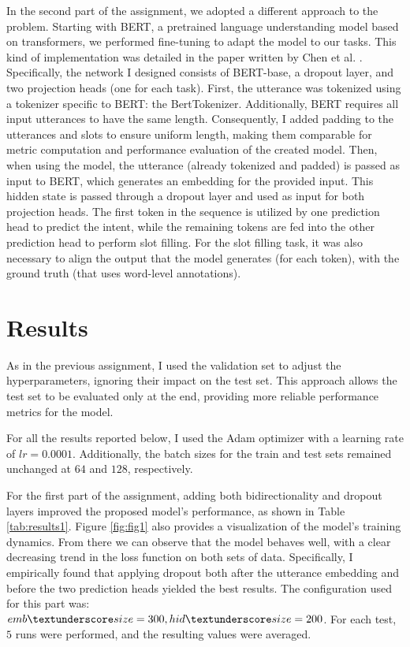 \documentclass[a4paper]{article}
\begin{document}
In the second part of the assignment, we adopted a different approach to the problem. Starting with BERT, a pretrained language understanding model based on transformers, we performed fine-tuning to adapt the model to our tasks.
This kind of implementation was detailed in the paper written by Chen et al. \cite{BERT}. Specifically, the network I designed consists of BERT-base, a dropout layer, and two projection heads (one for each task).
First, the utterance was tokenized using a tokenizer specific to BERT: the BertTokenizer.
Additionally, BERT requires all input utterances to have the same length. Consequently, I added padding to the utterances and slots to ensure uniform length, making them comparable for metric computation and performance evaluation of the created model.
Then, when using the model, the utterance (already tokenized and padded) is passed as input to BERT, which generates an embedding for the provided input. This hidden state is passed through a dropout layer and used as input for both projection heads. The first token in the sequence is utilized by one prediction head to predict the intent, while the remaining tokens are fed into the other prediction head to perform slot filling.
For the slot filling task, it was also necessary to align the output that the model generates (for each token), with the ground truth (that uses word-level annotations). 

\section{Results}
As in the previous assignment, I used the validation set to adjust the hyperparameters, ignoring their impact on the test set. This approach allows the test set to be evaluated only at the end, providing more reliable performance metrics for the model.

For all the results reported below, I used the Adam optimizer with a learning rate of \(lr = 0.0001\). Additionally, the batch sizes for the train and test sets remained unchanged at \(64\) and \(128\), respectively.

For the first part of the assignment, adding both bidirectionality and dropout layers improved the proposed model’s performance, as shown in Table \ref{tab:results1}. 
Figure \ref{fig:fig1} also provides a visualization of the model's training dynamics. From there we can observe that the model behaves well, with a clear decreasing trend in the loss function on both sets of data.
Specifically, I empirically found that applying dropout both after the utterance embedding and before the two prediction heads yielded the best results.
The configuration used for this part was: \(emb \textunderscore size=300, hid \textunderscore size=200\).
For each test, \(5\) runs were performed, and the resulting values were averaged.
\end{document}
